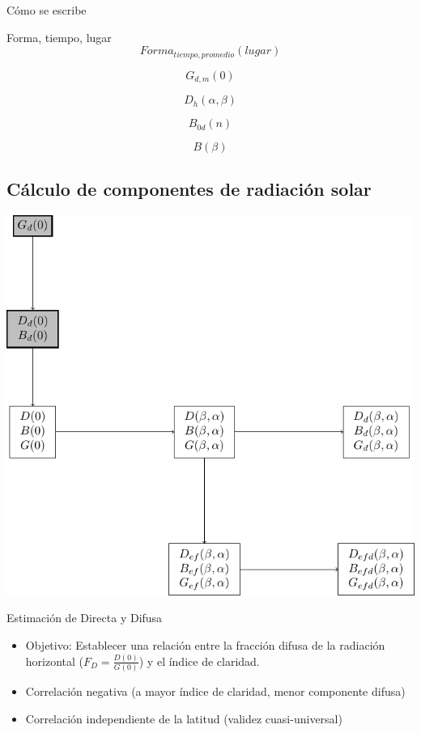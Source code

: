 \documentclass[xcolor={usenames,svgnames,dvipsnames}]{beamer}
\begin{document}
\begin{frame}[label={sec:org1aeec4c}]{Cómo se escribe}
\begin{block}{Forma, tiempo, lugar}
\[Forma_{tiempo,promedio}(lugar)\]

\[G_{d,m}(0)\]

\[D_{h}(\alpha,\beta)\]

\[B_{0d}(n)\]

\[B(\beta)\]
\end{block}
\end{frame}
\subsection{Cálculo de componentes de radiación solar}
\label{sec:org66d2ff3}

\begin{frame}[label={sec:org026a32d}]{}
\begin{center}
\includegraphics[width=.9\linewidth]{../figs/ProcedimientoCalculoRadiacionInclinada_componentes.pdf}
\end{center}
\end{frame}

\begin{frame}[label={sec:org96f36b5}]{Estimación de Directa y Difusa}
\begin{itemize}
\item Objetivo: Establecer una \alert{relación entre la fracción difusa} de la radiación horizontal (\(F_{D}=\frac{D(0)}{G(0)}\)) y \alert{el índice de claridad}.

\item \alert{Correlación negativa} (a mayor índice de claridad, menor componente difusa)

\item \alert{Correlación independiente de la latitud} (validez cuasi-universal)
\end{itemize}
\end{frame}
\end{document}
